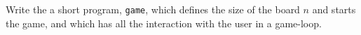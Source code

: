 Write the a short program, \lstinline{game}, which defines the size of the board $n$ and starts the game, and which has all the interaction with the user in a game-loop.
